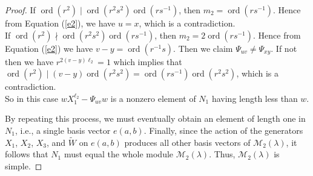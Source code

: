 \documentclass[12 pt,reqno]{amsart}
\numberwithin{equation}{section}
\DeclareMathOperator{\ord}{ord}
\theoremstyle{definition}
\theoremstyle{definition}
\theoremstyle{remark}
\theoremstyle{remark}
\begin{document}
\begin{proof}
    If $\ord(r^2) \mid \ord(r^2s^2)\ord(rs^{-1})$, then $m_2=\ord(rs^{-1})$. Hence from Equation (\ref{e2}), we have $u=x$, which is a contradiction. \\
    If $\ord(r^2) \nmid \ord(r^2s^2)\ord(rs^{-1})$, then $m_2=2\ord(rs^{-1})$. Hence from Equation (\ref{e2}) we have $v-y=\ord(r^{-1}s)$. Then we claim $\Psi_{uv}\neq \Psi_{xy}$. If not then we have $r^{2(v-y)\ell_2}=1$ which implies that $\ord(r^2)\mid (v-y)\ord(r^2s^{2})=\ord(rs^{-1})\ord(r^2s^2)$, which is a contradiction.\\
    So in this case $wX_1^{\ell_2}-\Psi_{uv}w$ is a nonzero element of $N_1$ having length less than $w$. 
    
    \noindent By repeating this process, we must eventually obtain an element of length one in $N_1$, i.e., a single basis vector $e(a,b)$. Finally, since the action of the generators $X_1$, $X_2$, $X_3$, and $\tilde{W}$ on $e(a,b)$ produces all other basis vectors of $\mathcal{M}_2(\lambda)$, it follows that $N_1$ must equal the whole module $\mathcal{M}_2(\lambda)$. Thus, $\mathcal{M}_2(\lambda)$ is simple.
\end{proof}
\end{document}
